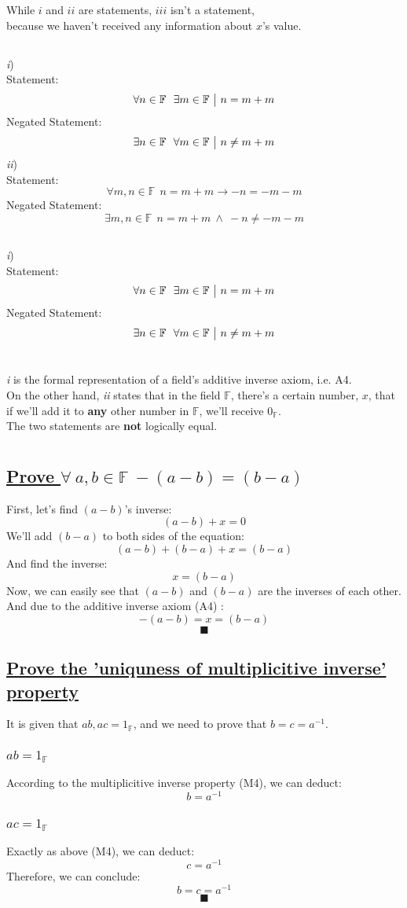 \documentclass[a4paper, 12pt]{article}
\newcommand{\sub}[1]{\subsection{\underline{#1}}}
\newcommand{\subsub}[1]{\subsubsection{\underline{#1}}}
\newcommand{\?}{\stackrel{?}{=}}
\newcommand{\F}{\ensuremath{\mathbb{F}}}
\renewcommand{\qed}{$$\blacksquare$$}
\renewcommand{\b}[1]{\textbf{#1}}
\begin{document}
\begin{titlepage}
    
\end{titlepage}

\section{}
\sub{}
While $i$ and $ii$ are statements, $iii$ isn't a statement,\\
because we haven't received any information about $x$'s value.
\sub{}
    \textit{i})\\
        Statement: $$ \forall{n}\in{\F} ~~ \exists{m}\in{\F} ~\big{|}~ n=m+m $$
        Negated Statement: $$ \exists{n}\in{\F} ~~ \forall{m}\in{\F} ~\big{|}~ n\neq m+m $$
    \textit{ii})\\
        Statement: $$ \forall{m,n}\in{\F} ~~ n=m+m \rightarrow -n=-m-m $$
        Negated Statement: $$ \exists{m,n}\in{\F} ~~ n=m+m ~\land~ -n\neq-m-m $$
\sub{}
    \textit{i})\\
        Statement: $$ \forall{n}\in{\F} ~~ \exists{m}\in{\F} ~\big{|}~ n=m+m $$
        Negated Statement: $$ \exists{n}\in{\F} ~~ \forall{m}\in{\F} ~\big{|}~ n\neq m+m $$

\section{}
\textit{i} is the formal representation of a field's additive inverse axiom, i.e. A4.\\
On the other hand, \textit{ii} states that in the field \F, there's a certain number, $x$,
that if we'll add it to \b{any} other number in \F, we'll receive $0_{\F}$.\\
The two statements are \b{not} logically equal.
\pagebreak

\section{}
\sub{Prove $\forall~a,b \in{\F}~ -(a-b)=(b-a)$}
First, let's find $(a-b)$'s inverse: $$ (a-b)+x=0 $$
We'll add $(b-a)$ to both sides of the equation: $$ (a-b)+(b-a)+x=(b-a) $$
And find the inverse: $$ x = (b-a) $$
Now, we can easily see that $(a-b)$ and $(b-a)$ are the inverses of each other.\\
And due to the additive inverse axiom (A4) : $$ -(a-b) = x = (b-a) $$
\qed

\sub{Prove the 'uniquness of multiplicitive inverse' property}
It is given that $ab, ac=1_{\F}$, and we need to prove that $b=c=a^{-1}$.
\subsub{$ab=1_{\F}$}
According to the multiplicitive inverse property (M4), we can deduct:
$$ b=a^{-1} $$
\subsub{$ac=1_{\F}$}
Exactly as above (M4), we can deduct:
$$ c=a^{-1} $$
Therefore, we can conclude: $$ b=c=a^{-1} $$
\qed
\pagebreak
\end{document}
